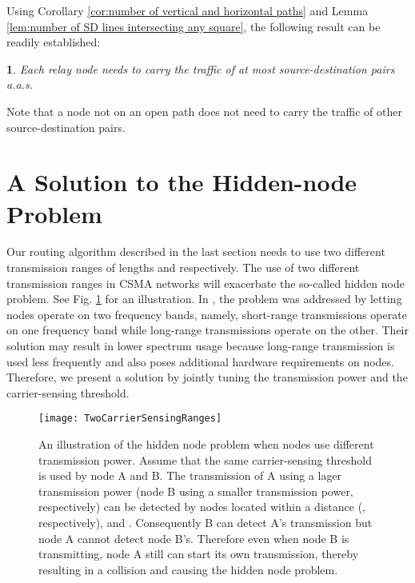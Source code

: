 \documentclass[english]{IEEEtran}
\theoremstyle{plain}
\theoremstyle{plain}
\theoremstyle{plain}
\newtheorem{lem}[thm]{\protect\lemmaname}
\theoremstyle{remark}
\providecommand{\lemmaname}{Lemma}
\begin{document}
Using Corollary \ref{cor:number of vertical and horizontal paths}
and Lemma \ref{lem:number of SD lines intersecting any square}, the
following result can be readily established:
\begin{lem}
\label{lem:result on traffic load}Each relay node needs to carry
the traffic of at most  source-destination
pairs a.a.s.
\end{lem}
Note that a node not on an open path does not need to carry the traffic
of other source-destination pairs.


\section{A Solution to the Hidden-node Problem\label{sec:Hidden-node-free-design}}

Our routing algorithm described in the last section needs to use two
different transmission ranges of lengths  and
 respectively. The use of two different
transmission ranges in CSMA networks will exacerbate the so-called
hidden node problem. See Fig. \ref{fig:Hidden node problem} for an
illustration. In \cite{Chau11Capacity}, the problem was addressed
by letting nodes operate on two frequency bands, namely, short-range
transmissions operate on one frequency band while long-range transmissions
operate on the other. Their solution may result in lower spectrum
usage because long-range transmission is used less frequently and
also poses additional hardware requirements on nodes. Therefore, we
present a solution by jointly tuning the transmission power and the
carrier-sensing threshold.

\begin{figure}
\begin{centering}
\texttt{[image: TwoCarrierSensingRanges]}
\par\end{centering}

\protect\caption{An illustration of the hidden node problem when nodes use different
transmission power. Assume that the same carrier-sensing threshold
is used by node A and B. The transmission of A using a lager transmission
power (node B using a smaller transmission power, respectively) can
be detected by nodes located within a distance  (,
respectively), and . Consequently B can detect A's transmission
but node A cannot detect node B's. Therefore even when node B is transmitting,
node A still can start its own transmission, thereby resulting in
a collision and causing the hidden node problem. \label{fig:Hidden node problem}}
\end{figure}
\end{document}

